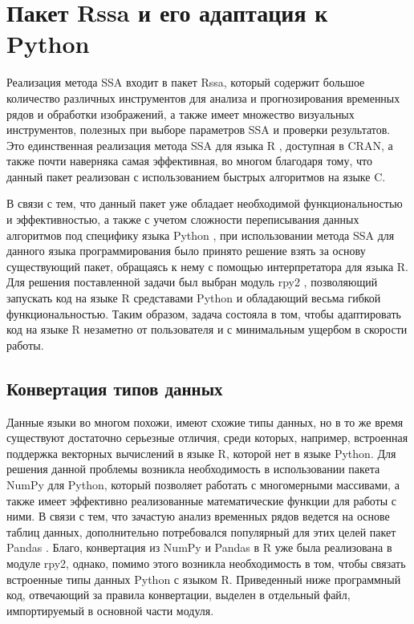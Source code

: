 \documentclass[specialist,
			   substylefile = spbu_report.rtx,
			   subf,href,colorlinks=true, 12pt]{disser}
\begin{document}
\chapter{Пакет Rssa и его адаптация к Python}

Реализация метода SSA входит в пакет Rssa, который содержит большое количество различных инструментов для анализа и прогнозирования временных рядов и обработки изображений, а также имеет множество визуальных инструментов, полезных при выборе параметров SSA и проверки результатов. Это единственная реализация метода SSA для языка R \cite{r-doc}, доступная в CRAN, а также почти наверняка самая эффективная, во многом благодаря тому, что данный пакет реализован с использованием быстрых алгоритмов на языке C.

В связи с тем, что данный пакет уже обладает необходимой функциональностью и эффективностью, а также с учетом сложности переписывания данных алгоритмов под специфику языка Python \cite{py-doc}, при использовании метода SSA для данного языка программирования было принято решение взять за основу существующий пакет, обращаясь к нему с помощью интерпретатора для языка R. Для решения поставленной задачи был выбран модуль rpy2 \cite{rpy-doc}, позволяющий запускать код на языке R средставами Python и обладающий весьма гибкой функциональностью. Таким образом, задача состояла в том, чтобы адаптировать код на языке R незаметно от пользователя и с минимальным ущербом в скорости работы.

\section{Конвертация типов данных}

Данные языки во многом похожи, имеют схожие типы данных, но в то же время существуют достаточно серьезные отличия, среди которых, например, встроенная поддержка векторных вычислений в языке R, которой нет в языке Python. Для решения данной проблемы возникла необходимость в использовании пакета NumPy \cite{numpy-doc} для Python, который позволяет работать с многомерными массивами, а также имеет эффективно реализованные математические функции для работы с ними. В связи с тем, что зачастую анализ временных рядов ведется на основе таблиц данных, дополнительно потребовался популярный для этих целей пакет Pandas \cite{pandas-doc}.  Благо, конвертация из NumPy и Pandas в R уже была реализована в модуле rpy2, однако, помимо этого возникла необходимость в том, чтобы связать встроенные типы данных Python с языком R. Приведенный ниже программный код, отвечающий за правила конвертации, выделен в отдельный файл, импортируемый в основной части модуля.
\end{document}
